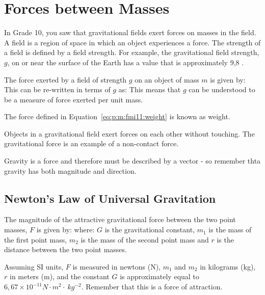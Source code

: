 \section{Forces between Masses}

In Grade 10, you saw that gravitational fields exert forces on masses in the field. A field is a region of space in which an object experiences a force. The strength of a field is defined by a field strength. For example, the gravitational field strength, $g$, on or near the surface of the Earth has a value that is approximately 9,8 \mss.

The force exerted by a field of strength $g$ on an object of mass $m$ is given by:
This can be re-written in terms of $g$ as:
This means that $g$ can be understood to be a measure of force exerted per unit mass.

The force defined in Equation~\ref{eq:p:m:fmi11:weight} is known as weight.

Objects in a gravitational field exert forces on each other without touching. The gravitational force is an example of a non-contact force.

Gravity is a force and therefore must be described by a vector - so remember thta gravity has both magnitude and direction.

\subsection{Newton's Law of Universal Gravitation}


The magnitude of the attractive gravitational force between the two point masses, $F$ is given by:
where:
$G$ is the gravitational constant, $m_1$ is the mass of the first point mass, $m_2$ is the mass of the second point mass and $r$ is the distance between the two point masses.

Assuming SI units, $F$ is measured in newtons (N), $m_1$ and $m_2$ in kilograms (kg), $r$ in meters (m), and the constant $G$ is approximately equal to $6,67 \times 10^{-11} N\cdot m^2\cdot~kg^{-2}$. Remember that this is a force of attraction.

